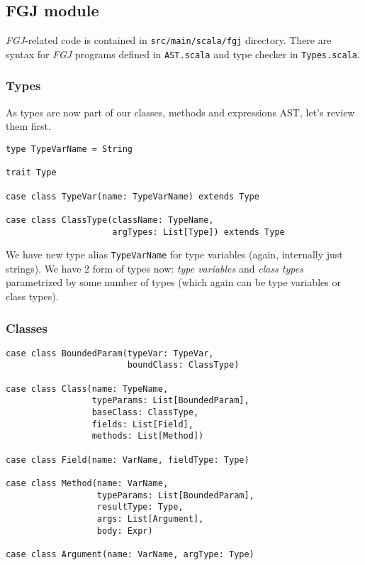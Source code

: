 \documentclass{article}[12pt]
\begin{document}
\subsection{FGJ module}

\emph{FGJ}-related code is contained in \texttt{src/main/scala/fgj} directory. There are syntax for \emph{FGJ} programs defined in \texttt{AST.scala} and type checker in \texttt{Types.scala}.

\subsubsection{Types}

As types are now part of our classes, methods and expressions AST, let's review them first.

\begin{verbatim}
type TypeVarName = String

trait Type

case class TypeVar(name: TypeVarName) extends Type

case class ClassType(className: TypeName,
                     argTypes: List[Type]) extends Type
\end{verbatim}

We have new type alias \texttt{TypeVarName} for type variables (again, internally just strings). We have 2 form of types now: \emph{type variables} and \emph{class types} parametrized by some number of types (which again can be type variables or class types).

\subsubsection{Classes}

\begin{verbatim}
case class BoundedParam(typeVar: TypeVar,
                        boundClass: ClassType)

case class Class(name: TypeName,
                 typeParams: List[BoundedParam],
                 baseClass: ClassType,
                 fields: List[Field],
                 methods: List[Method])

case class Field(name: VarName, fieldType: Type)

case class Method(name: VarName,
                  typeParams: List[BoundedParam],
                  resultType: Type,
                  args: List[Argument],
                  body: Expr)
                  
case class Argument(name: VarName, argType: Type)
\end{verbatim}
\end{document}
